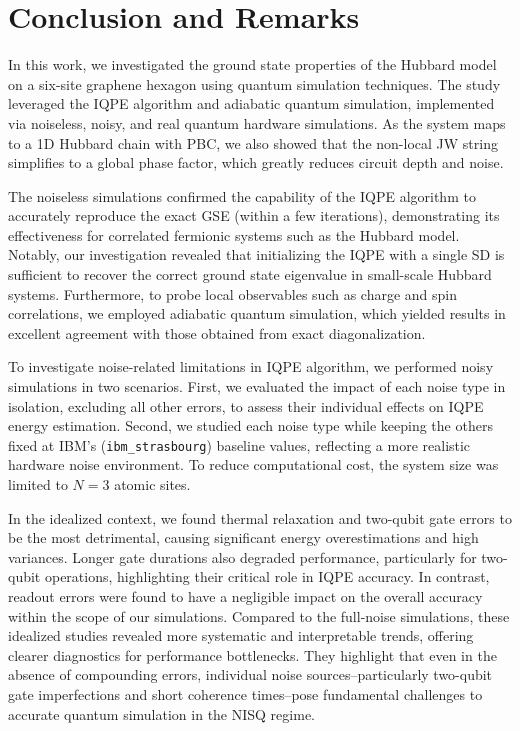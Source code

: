 \documentclass[twocolumn,superscriptaddress,amsmath,amssymb,showpacs,floatfix,preprintnumbers]{revtex4-1}
\newcommand{\ibmstr}{\texttt{ibm\_strasbourg}}
\begin{document}
\section{Conclusion and Remarks} \label{con}
In this work, we investigated the ground state properties of the Hubbard model on a six-site graphene
hexagon using quantum simulation techniques. 
%
The study leveraged the IQPE algorithm and adiabatic quantum simulation, implemented via noiseless,
noisy, and real quantum hardware simulations.
%
As the system maps to a 1D Hubbard chain with PBC, we also showed that the non-local JW string simplifies to a global phase factor, which greatly reduces circuit depth and noise.

The noiseless simulations confirmed the capability of the IQPE algorithm to accurately reproduce the 
exact GSE (within a few iterations), demonstrating its effectiveness for correlated fermionic systems such as the Hubbard model.
%
Notably, our investigation revealed that initializing the IQPE with a single SD is
sufficient to recover the correct ground state eigenvalue in small-scale Hubbard systems.
%
Furthermore, to probe local observables such as charge and spin correlations, we employed adiabatic 
quantum simulation, which yielded results in excellent agreement with those obtained from exact
diagonalization.

To investigate noise-related limitations in IQPE algorithm, we performed noisy simulations in two scenarios.
%
First, we evaluated the impact of each noise type in isolation, excluding all other errors, to assess 
their individual effects on IQPE energy estimation. 
%
Second, we studied each noise type while keeping the others fixed at IBM's (\ibmstr) baseline values, reflecting 
a more realistic hardware noise environment. 
%
To reduce computational cost, the system size was limited to $N=3$ atomic sites.

In the idealized context, we found thermal relaxation and two-qubit gate errors to be the most detrimental, 
causing significant energy overestimations and high variances.
%
Longer gate durations also degraded performance, particularly for two-qubit operations, highlighting
their critical role in IQPE accuracy.
%
In contrast, readout errors were found to have a negligible impact on the overall accuracy within 
the scope of our simulations.
%
Compared to the full-noise simulations, these idealized studies revealed more systematic and
interpretable trends, offering clearer diagnostics for performance bottlenecks. 
%
They highlight that even in the absence of compounding errors, individual noise sources--particularly
two-qubit gate imperfections and short coherence times--pose fundamental challenges to accurate 
quantum simulation in the NISQ regime.
\end{document}
